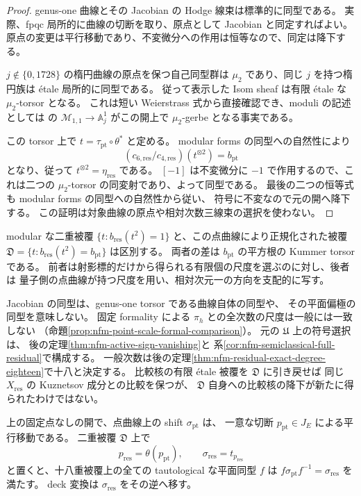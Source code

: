 \begin{proof}
genus-one 曲線とその Jacobian の Hodge 線束は標準的に同型である。
実際、fpqc 局所的に曲線の切断を取り、原点として Jacobian と同定すればよい。
原点の変更は平行移動であり、不変微分への作用は恒等なので、同定は降下する。

$j\notin\{0,1728\}$ の楕円曲線の原点を保つ自己同型群は
$\mu_2$ であり、同じ $j$ を持つ楕円族は \'etale 局所的に同型である。
従って表示した Isom sheaf は有限 \'etale な $\mu_2$-torsor となる。
これは短い Weierstrass 式から直接確認でき、moduli の記述としては
\cite[proof of Corollary~2.4, p.~91]{NFMFultonOlsson}
の $\mathcal M_{1,1}\to\mathbb A^1_j$ がこの開上で
$\mu_2$-gerbe となる事実である。

この torsor 上で $t=\tau_{\mathrm{pt}}\circ\theta^*$ と定める。
modular forms の同型への自然性により
\[
 (c_{6,\mathrm{res}}/c_{4,\mathrm{res}})(t^{\otimes2})
 =b_{\mathrm{pt}}
\]
となり、従って $t^{\otimes2}=\eta_{\mathrm{res}}$ である。
$[-1]$ は不変微分に $-1$ で作用するので、これは二つの
$\mu_2$-torsor の同変射であり、よって同型である。
最後の二つの恒等式も modular forms の同型への自然性から従い、
符号に不変なので元の開へ降下する。
この証明は対象曲線の原点や相対次数三線束の選択を使わない。
\end{proof}

\begin{remark}[他の尺度正規化と比較の範囲]
modular な二重被覆
$\{t:b_{\mathrm{res}}(t^2)=1\}$ と、この点曲線により正規化された被覆
$\mathfrak D=\{t:b_{\mathrm{res}}(t^2)=b_{\mathrm{pt}}\}$ は区別する。
両者の差は $b_{\mathrm{pt}}$ の平方根の Kummer torsor である。
前者は射影標的だけから得られる有限個の尺度を選ぶのに対し、後者は
量子側の点曲線が持つ尺度を用い、相対次元一の方向を支配的に写す。

Jacobian の同型は、genus-one torsor である曲線自体の同型や、
その平面偏極の同型を意味しない。
固定 formality による $\pi_h$ との全次数の尺度は一般には一致しない
（命題\ref{prop:nfm-point-scale-formal-comparison}）。
元の $\mathfrak U$ 上の符号選択は、
後の定理\ref{thm:nfm-active-sign-vanishing}と
系\ref{cor:nfm-semiclassical-full-residual}で構成する。
一般次数は後の定理\ref{thm:nfm-residual-exact-degree-eighteen}で十八と決定する。
比較核の有限 \'etale 被覆を $\mathfrak D$ に引き戻せば
同じ $X_{\mathrm{res}}$ の Kuznetsov 成分との比較を保つが、
$\mathfrak D$ 自身への比較核の降下が新たに得られたわけではない。
\end{remark}

\begin{corollary}
\label{cor:nfm-point-shift-residual-transfer}
上の固定点なしの開で、点曲線上の shift $\sigma_{\mathrm{pt}}$ は、
一意な切断 $p_{\mathrm{pt}}\in J_E$ による平行移動である。
二重被覆 $\mathfrak D$ 上で
\[
 p_{\mathrm{res}}=\theta(p_{\mathrm{pt}}),\qquad
 \sigma_{\mathrm{res}}=t_{p_{\mathrm{res}}}
\]
と置くと、十八重被覆上の全ての tautological な平面同型 $f$ は
$f\sigma_{\mathrm{pt}}f^{-1}=\sigma_{\mathrm{res}}$ を満たす。
deck 変換は $\sigma_{\mathrm{res}}$ をその逆へ移す。
\end{corollary}

